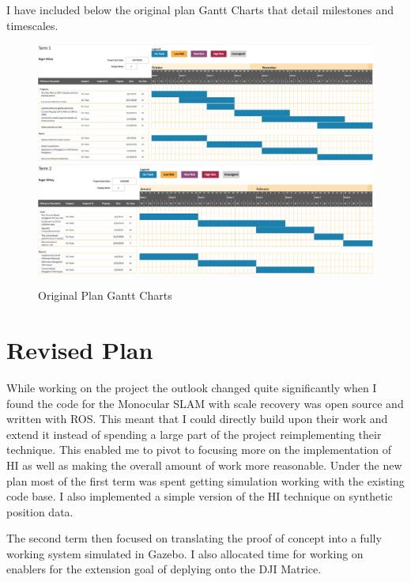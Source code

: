 \documentclass[]{../resources/final_report}
\begin{document}
I have included below the original plan Gantt Charts that detail milestones and timescales.
\\
\begin{figure}[h]
  \centering
  \includegraphics[width=\textwidth]{Term1Ganttv1.png}
  \includegraphics[width=\textwidth]{Term2Ganttv1.png}
  \caption{Original Plan Gantt Charts}
  \label{}
\end{figure}

\pagebreak

\section{Revised Plan}

While working on the project the outlook changed quite significantly when I found the code for the Monocular SLAM with scale recovery was open source and written with ROS. This meant that I could directly build upon their work and extend it instead of spending a large part of the project reimplementing their technique. This enabled me to pivot to focusing more on the implementation of HI as well as making the overall amount of work more reasonable. Under the new plan most of the first term was spent getting simulation working with the existing code base. I also implemented a simple version of the HI technique on synthetic position data.

The second term then focused on translating the proof of concept into a fully working system simulated in Gazebo. I also allocated time for working on enablers for the extension goal of deplying onto the DJI Matrice.
\end{document}
